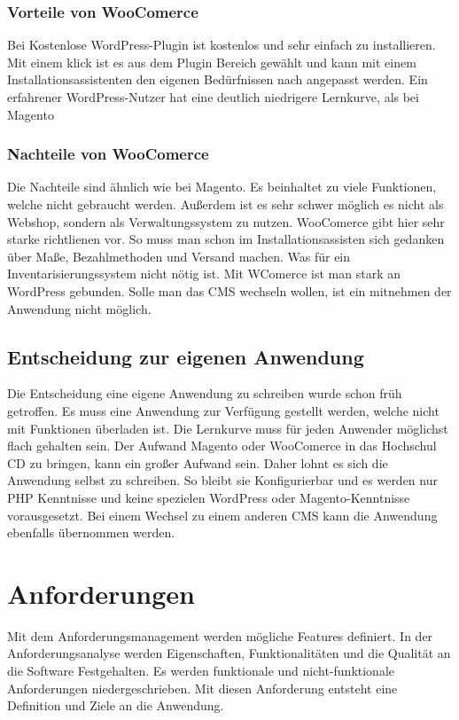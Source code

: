 \subsubsection{Vorteile von WooComerce}
Bei Kostenlose WordPress-Plugin ist kostenlos und sehr einfach zu installieren. Mit einem klick ist es aus dem Plugin Bereich gewählt und kann mit einem Installationsassistenten den eigenen Bedürfnissen nach angepasst werden. Ein erfahrener WordPress-Nutzer hat eine deutlich niedrigere Lernkurve, als bei Magento \autocite{WooComerce.2018}

\subsubsection{Nachteile von WooComerce}
Die Nachteile sind ähnlich wie bei Magento. Es beinhaltet zu viele Funktionen, welche nicht gebraucht werden. Außerdem ist es sehr schwer möglich es nicht als Webshop, sondern als Verwaltungssystem zu nutzen. WooComerce gibt hier sehr starke richtlienen vor. So muss man schon im Installationsassisten sich gedanken über Maße, Bezahlmethoden und Versand machen. Was für ein Inventarisierungssystem nicht nötig ist. Mit WComerce ist man stark an WordPress gebunden. Solle man das \ac{CMS} wechseln wollen, ist ein mitnehmen der Anwendung nicht möglich.

\subsection{Entscheidung zur eigenen Anwendung}
Die Entscheidung eine eigene Anwendung zu schreiben wurde schon früh getroffen. Es muss eine Anwendung zur Verfügung gestellt werden, welche nicht mit Funktionen überladen ist. Die Lernkurve muss für jeden Anwender möglichst flach gehalten sein. Der Aufwand Magento oder WooComerce in das Hochschul \ac{CD} zu bringen, kann ein großer Aufwand sein. Daher lohnt es sich die Anwendung selbst zu schreiben. So bleibt sie Konfigurierbar und es werden nur \ac{PHP} Kenntnisse und keine spezielen WordPress oder Magento-Kenntnisse vorausgesetzt. Bei einem Wechsel zu einem anderen \ac{CMS} kann die Anwendung ebenfalls übernommen werden.

\section{Anforderungen}

Mit dem Anforderungsmanagement werden mögliche Features definiert. In der Anforderungsanalyse werden Eigenschaften, Funktionalitäten und die Qualität an die Software Festgehalten. \autocite{Grande.2014} Es werden funktionale und nicht-funktionale Anforderungen niedergeschrieben. Mit diesen Anforderung entsteht eine Definition und Ziele an die Anwendung.

